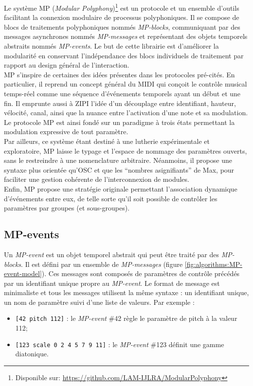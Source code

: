 \noindent Le système MP (\textit{Modular Polyphony})\footnote{Disponible sur: \url{https://github.com/LAM-IJLRA/ModularPolyphony}} est un protocole et un ensemble d'outils facilitant la connexion modulaire de processus polyphoniques. Il se compose de blocs de traitements polyphoniques nommés \textit{MP-blocks}, communiquant par des messages asynchrones nommés \textit{MP-messages} et représentant des objets temporels abstraits nommés \textit{MP-events}. Le but de cette librairie est d'améliorer la modularité en conservant l'indépendance des blocs individuels de traitement par rapport au design général de l'interaction.\\
\indent MP s'inspire de certaines des idées présentes dans les protocoles pré-cités. En particulier, il reprend un concept général du \gls{MIDI} qui conçoit le contrôle musical temps-réel comme une séquence d'événements temporels ayant un début et une fin. Il emprunte aussi à \gls{ZIPI} l'idée d'un découplage entre identifiant, hauteur, vélocité, canal, ainsi que la nuance entre l'activation d'une note et sa modulation. Le protocole MP est ainsi fondé sur un paradigme à trois états permettant la modulation expressive de tout paramètre.\\
\indent Par ailleurs, ce système étant destiné à une lutherie expérimentale et exploratoire, MP laisse le typage et l'espace de nommage des paramètres ouverts, sans le restreindre à une nomenclature arbitraire. Néanmoins, il propose une syntaxe plus orientée qu'\gls{OSC} et que les ``nombres asignifiants'' de Max, pour faciliter une gestion cohérente de l'interconnexion de modules.\\
\indent Enfin, MP propose une stratégie originale permettant l'association dynamique d'événements entre eux, de telle sorte qu'il soit possible de contrôler les paramètres par groupes (et sous-groupes).\\

\subsection{MP-events}

\noindent Un \textit{MP-event} est un objet temporel abstrait qui peut être traité par des \textit{MP-blocks}. Il est défini par un ensemble de \textit{MP-messages} (figure \ref{fig:algorithms:MP-event-model}). Ces messages sont composés de paramètres de contrôle précédés par un identifiant unique propre au \textit{MP-event}. Le format de message est minimaliste et tous les messages utilisent la même syntaxe : un identifiant unique, un nom de paramètre suivi d'une liste de valeurs. Par exemple :
\vspace{-1em}
\begin{itemize}[noitemsep]
	\item{\verb|[42 pitch 112]| : le \textit{MP-event} \#42 règle le paramètre de pitch à la valeur 112;}
	\item{\verb|[123 scale 0 2 4 5 7 9 11]| : le \textit{MP-event} \#123 définit une gamme diatonique.}
\end{itemize}

